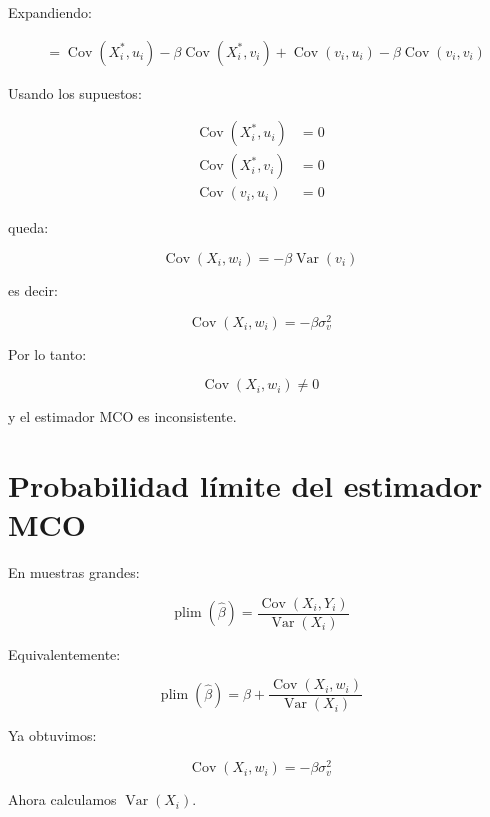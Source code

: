 \documentclass[12pt,letterpaper]{article}
\newcommand{\Var}{\operatorname{Var}}
\newcommand{\Cov}{\operatorname{Cov}}
\newcommand{\plim}{\operatorname{plim}}
\begin{document}
Expandiendo:

\begin{align}
&=
\Cov(X_i^{*},u_i)
-\beta\Cov(X_i^{*},v_i)
+\Cov(v_i,u_i)
-\beta\Cov(v_i,v_i)
\end{align}

Usando los supuestos:

\begin{align}
\Cov(X_i^{*},u_i)&=0 \\
\Cov(X_i^{*},v_i)&=0 \\
\Cov(v_i,u_i)&=0
\end{align}

queda:

\begin{equation}
\Cov(X_i,w_i)
=
-\beta\Var(v_i)
\end{equation}

es decir:

\begin{equation}
\boxed{
\Cov(X_i,w_i)
=
-\beta\sigma_v^2
}
\end{equation}

Por lo tanto:

\begin{equation}
\Cov(X_i,w_i)\neq0
\end{equation}

y el estimador MCO es inconsistente.

\section{Probabilidad límite del estimador MCO}

En muestras grandes:

\begin{equation}
\plim(\hat{\beta})
=
\frac{\Cov(X_i,Y_i)}
{\Var(X_i)}
\end{equation}

Equivalentemente:

\begin{equation}
\plim(\hat{\beta})
=
\beta
+
\frac{\Cov(X_i,w_i)}
{\Var(X_i)}
\end{equation}

Ya obtuvimos:

\begin{equation}
\Cov(X_i,w_i)
=
-\beta\sigma_v^2
\end{equation}

Ahora calculamos $\Var(X_i)$.
\end{document}
